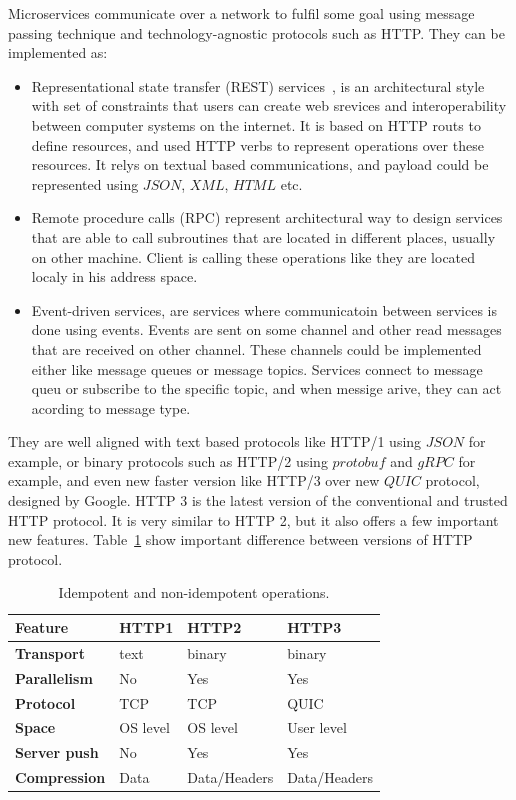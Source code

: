 Microservices communicate over a network to fulfil some goal using message passing technique and technology-agnostic protocols such as HTTP. They can be implemented as:

\begin{itemize}
	\item Representational state transfer (REST) services~\cite{AdamczykSJH11}, is an architectural style with set of constraints that users can create web srevices and interoperability between computer systems on the internet. It is based on HTTP routs to define resources, and used HTTP verbs to represent operations over these resources. It relys on textual based communications, and payload could be represented using $JSON$, $XML$, $HTML$ etc.
	\item Remote procedure calls (RPC) represent architectural way to design services that are able to call subroutines that are located in different places, usually on other machine. Client is calling these operations like they are located localy in his address space.
	\item Event-driven services, are services where communicatoin between services is done using events. Events are sent on some channel and other read messages that are received on other channel. These channels could be implemented either like message queues or message topics. Services connect to message queu or subscribe to the specific topic, and when messige arive, they can act acording to message type.
\end{itemize}
 
 They are well aligned with text based protocols like HTTP/1 using $JSON$ for example, or binary protocols such as HTTP/2 using $protobuf$ and $gRPC$ for example, and even new faster version like HTTP/3 over new $QUIC$ protocol, designed by Google. HTTP 3 is the latest version of the conventional and trusted HTTP protocol. It is very similar to HTTP 2, but it also offers a few important new features. Table~\ref{tab:table9} show important difference between versions of HTTP protocol.
 
 \begin{table}[h!]
 	\begin{center}
 		\begin{tabular}{l|l|l|l}
 			\textbf{Feature} & \textbf{HTTP1} & \textbf{HTTP2} & \textbf{HTTP3}\\
 			\hline
 			\textbf{Transport} & text & binary & binary\\
 			\textbf{Parallelism} & No & Yes & Yes\\
 			\textbf{Protocol} & TCP & TCP & QUIC \\
 			\textbf{Space} & OS level & OS level & User level\\
 			\textbf{Server push} & No & Yes & Yes\\
 			\textbf{Compression} & Data & Data/Headers & Data/Headers\\
 		\end{tabular}
 	\end{center}
 	\vspace{-0.5cm}
 	\caption{Idempotent and non-idempotent operations.}
 	\label{tab:table9}
 \end{table}
 
